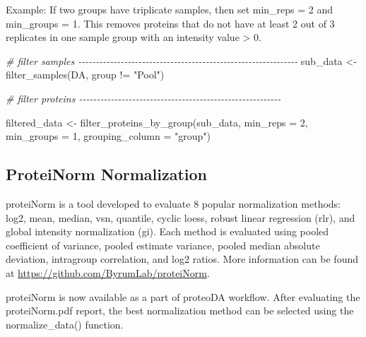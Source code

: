 \documentclass[
]{article}
\newenvironment{Shaded}{\begin{snugshade}}{\end{snugshade}}
\newcommand{\AttributeTok}[1]{\textcolor[rgb]{0.77,0.63,0.00}{#1}}
\newcommand{\CommentTok}[1]{\textcolor[rgb]{0.56,0.35,0.01}{\textit{#1}}}
\newcommand{\DecValTok}[1]{\textcolor[rgb]{0.00,0.00,0.81}{#1}}
\newcommand{\FunctionTok}[1]{\textcolor[rgb]{0.00,0.00,0.00}{#1}}
\newcommand{\NormalTok}[1]{#1}
\newcommand{\OtherTok}[1]{\textcolor[rgb]{0.56,0.35,0.01}{#1}}
\newcommand{\SpecialCharTok}[1]{\textcolor[rgb]{0.00,0.00,0.00}{#1}}
\newcommand{\StringTok}[1]{\textcolor[rgb]{0.31,0.60,0.02}{#1}}
\begin{document}
Example: If two groups have triplicate samples, then set min\_reps = 2
and min\_groups = 1. This removes proteins that do not have at least 2
out of 3 replicates in one sample group with an intensity value
\textgreater{} 0.

\begin{Shaded}
\begin{Highlighting}[]
\CommentTok{\# filter samples {-}{-}{-}{-}{-}{-}{-}{-}{-}{-}{-}{-}{-}{-}{-}{-}{-}{-}{-}{-}{-}{-}{-}{-}{-}{-}{-}{-}{-}{-}{-}{-}{-}{-}{-}{-}{-}{-}{-}{-}{-}{-}{-}{-}{-}{-}{-}{-}{-}{-}{-}{-}{-}{-}{-}{-}{-}{-}{-}{-}{-}{-}}
\NormalTok{sub\_data }\OtherTok{\textless{}{-}} \FunctionTok{filter\_samples}\NormalTok{(DA, group }\SpecialCharTok{!=} \StringTok{"Pool"}\NormalTok{)}

\CommentTok{\# filter proteins {-}{-}{-}{-}{-}{-}{-}{-}{-}{-}{-}{-}{-}{-}{-}{-}{-}{-}{-}{-}{-}{-}{-}{-}{-}{-}{-}{-}{-}{-}{-}{-}{-}{-}{-}{-}{-}{-}{-}{-}{-}{-}{-}{-}{-}{-}{-}{-}{-}{-}{-}{-}{-}{-}{-}{-}{-}}

\NormalTok{filtered\_data }\OtherTok{\textless{}{-}} \FunctionTok{filter\_proteins\_by\_group}\NormalTok{(sub\_data,}
                                          \AttributeTok{min\_reps =} \DecValTok{2}\NormalTok{,}
                                          \AttributeTok{min\_groups =} \DecValTok{1}\NormalTok{,}
                                          \AttributeTok{grouping\_column =} \StringTok{"group"}\NormalTok{)}
\end{Highlighting}
\end{Shaded}

\hypertarget{proteinorm-normalization}{%
\subsection{ProteiNorm Normalization}\label{proteinorm-normalization}}

proteiNorm is a tool developed to evaluate 8 popular normalization
methods: log2, mean, median, vsn, quantile, cyclic loess, robust linear
regression (rlr), and global intensity normalization (gi). Each method
is evaluated using pooled coefficient of variance, pooled estimate
variance, pooled median absolute deviation, intragroup correlation, and
log2 ratios. More information can be found at
\url{https://github.com/ByrumLab/proteiNorm}.

proteiNorm is now available as a part of proteoDA workflow. After
evaluating the proteiNorm.pdf report, the best normalization method can
be selected using the normalize\_data() function.
\end{document}
